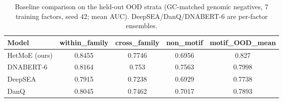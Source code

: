 \begin{table}[ht]\centering
\caption{Baseline comparison on the held-out OOD strata (GC-matched genomic negatives, 7 training factors, seed 42; mean AUC). DeepSEA/DanQ/DNABERT-6 are per-factor ensembles.}\label{tab:baseline_ood}
\begin{tabular}{lc c c c}
\hline
Model & within_family & cross_family & non_motif & motif_OOD_mean \\
\hline
HetMoE (ours) & 0.8455 & 0.7746 & 0.6956 & 0.827\\
DNABERT-6 & 0.8164 & 0.753 & 0.7563 & 0.7998\\
DeepSEA & 0.7915 & 0.7238 & 0.6929 & 0.7738\\
DanQ & 0.8045 & 0.7462 & 0.7017 & 0.7893 \\
\hline
\end{tabular}\end{table}
